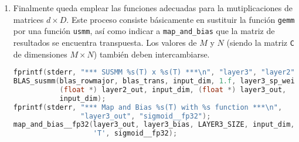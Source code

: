 \begin{enumerate}
    \item Finalmente queda emplear las funciones adecuadas para la mutiplicaciones de matrices $d \times D$. Este proceso consiste básicamente en sustituir la función \texttt{gemm} por una función \texttt{usmm}, así como indicar a \texttt{map\_and\_bias} que la matriz de resultados se encuentra transpuesta. Los valores de $M$ y $N$ (siendo la matriz \texttt{C} de dimensiones $M\times N$) también deben intercambiarse.
\begin{lstlisting}[language=C]
fprintf(stderr, "*** SUSMM %s(T) x %s(T) ***\n", "layer3", "layer2");
BLAS_susmm(blas_rowmajor, blas_trans, input_dim, 1.f, layer3_sp_weights,
           (float *) layer2_out, input_dim, (float *) layer3_out,
           input_dim);
fprintf(stderr, "*** Map and Bias %s(T) with %s function ***\n",
                "layer3_out", "sigmoid__fp32");
map_and_bias__fp32(layer3_out, layer3_bias, LAYER3_SIZE, input_dim,
                   'T', sigmoid__fp32);
\end{lstlisting}
\end{enumerate}